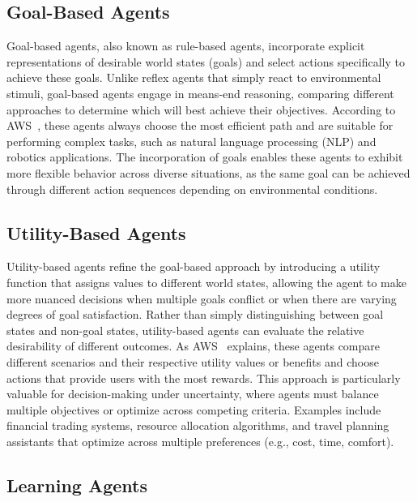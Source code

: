 \subsection{Goal-Based Agents}

Goal-based agents, also known as rule-based agents, incorporate explicit representations of desirable world states (goals) and select actions specifically to achieve these goals. Unlike reflex agents that simply react to environmental stimuli, goal-based agents engage in means-end reasoning, comparing different approaches to determine which will best achieve their objectives. According to AWS~\cite{aws2024goalagents}, these agents always choose the most efficient path and are suitable for performing complex tasks, such as natural language processing (NLP) and robotics applications. The incorporation of goals enables these agents to exhibit more flexible behavior across diverse situations, as the same goal can be achieved through different action sequences depending on environmental conditions.


\subsection{Utility-Based Agents}

Utility-based agents refine the goal-based approach by introducing a utility function that assigns values to different world states, allowing the agent to make more nuanced decisions when multiple goals conflict or when there are varying degrees of goal satisfaction. Rather than simply distinguishing between goal states and non-goal states, utility-based agents can evaluate the relative desirability of different outcomes. As AWS~\cite{aws2024utilityagents} explains, these agents compare different scenarios and their respective utility values or benefits and choose actions that provide users with the most rewards. This approach is particularly valuable for decision-making under uncertainty, where agents must balance multiple objectives or optimize across competing criteria. Examples include financial trading systems, resource allocation algorithms, and travel planning assistants that optimize across multiple preferences (e.g., cost, time, comfort).


\subsection{Learning Agents}

